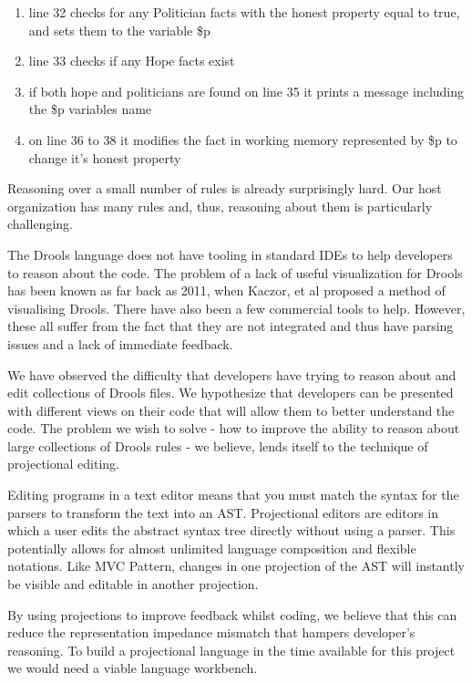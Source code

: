 \begin{enumerate}[topsep=2pt,itemsep=2pt,partopsep=2pt, parsep=2pt]
\begin{enumerate}[topsep=2pt,itemsep=2pt,partopsep=2pt, parsep=2pt]
        \item line 32 checks for any Politician facts with the honest property equal to true, and sets them to the variable \$p
        \item line 33 checks if any Hope facts exist
        \item if both hope and politicians are found on line 35 it prints a message including the \$p variables name
        \item on line 36 to 38 it modifies the fact in working memory represented by \$p to change it's honest property 
    \end{enumerate}
\end{enumerate}

Reasoning over a small number of rules is already surprisingly hard.
Our host organization has many rules and, thus, reasoning about them is particularly challenging.

The Drools language does not have tooling in standard IDEs to help developers to reason about the code.
The problem of a lack of useful visualization for Drools has been known as far back as 2011, when Kaczor, et al\cite{kaczor2011visual} proposed a method of visualising Drools. 
There have also been a few commercial tools to help.
However, these all suffer from the fact that they are not integrated and thus have parsing issues and a lack of immediate feedback. 

We have observed the difficulty that developers have trying to reason about and edit collections of Drools files.
We hypothesize that developers can be presented with different views on their code that will allow them to better understand the code.
The problem we wish to solve - how to improve the ability to reason about large collections of Drools rules - we believe, lends itself to the technique of projectional editing.

Editing programs in a text editor means that you must match the syntax for the parsers to transform the text into an AST.
Projectional editors are editors in which a user edits the abstract syntax tree directly without using a parser\cite{voelter2014generic}.
This potentially allows for almost unlimited language composition and flexible notations.
Like MVC Pattern, changes in one projection of the AST will instantly be visible and editable in another projection\cite{guttormsen2017consistent}.

By using projections to improve feedback whilst coding, we believe that this can reduce the representation impedance mismatch that hampers developer's reasoning.
To build a projectional language in the time available for this project we would need a viable language workbench.
